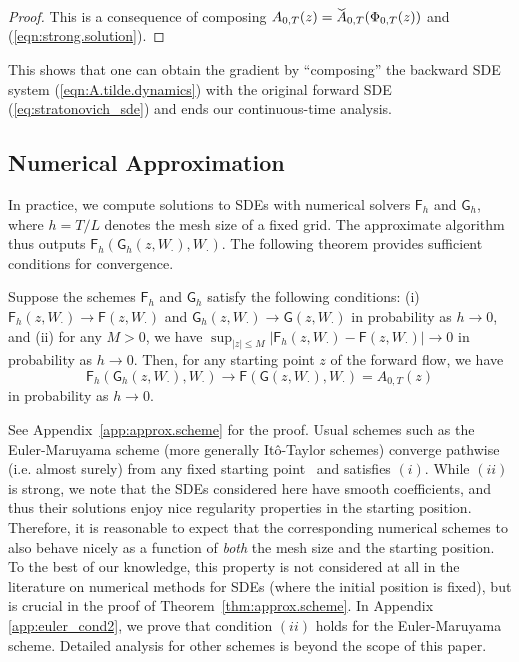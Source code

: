 \documentclass[twoside]{article}
\begin{document}
\begin{proof}
This is a consequence of composing $A_{0, T}(z) = \widecheck{A}_{0, T} (\Phi_{0, T}(z))$ and (\ref{eqn:strong.solution}).
\end{proof}
This shows that one can obtain the gradient by ``composing'' the backward SDE system (\ref{eqn:A.tilde.dynamics}) with the original forward SDE (\ref{eq:stratonovich_sde}) and ends our continuous-time analysis.




\subsection{Numerical Approximation} \label{subsec:numerical_approximation}
In practice, we compute solutions to SDEs with numerical solvers $\mathsf{F}_h$ and $\mathsf{G}_h$, where $h = T / L$ denotes the mesh size of a fixed grid. The approximate algorithm thus outputs $\mathsf{F}_h(\mathsf{G}_h(z, W_{\cdot}), W_{\cdot})$. The following theorem provides sufficient conditions for convergence. 

\begin{theo} \label{thm:approx.scheme}
Suppose the schemes $\mathsf{F}_h$ and $\mathsf{G}_h$ satisfy the following conditions: (i) $\mathsf{F}_h(z, W_{\cdot}) \rightarrow \mathsf{F}(z, W_{\cdot})$ and $\mathsf{G}_h(z, W_{\cdot}) \rightarrow \mathsf{G}(z, W_{\cdot})$ in probability as $h \rightarrow 0$, and (ii) for any $M > 0$, we have $\sup_{| z | \le M} | \mathsf{F}_h(z, W_{\cdot}) - \mathsf{F}(z, W_{\cdot}) | \rightarrow 0$ in probability as $h \rightarrow 0$. Then, for any starting point $z$ of the forward flow, we have
\[
\mathsf{F}_h(\mathsf{G}_h(z, W_{\cdot}), W_{\cdot}) \rightarrow \mathsf{F}(\mathsf{G}(z, W_{\cdot}), W_{\cdot}) = A_{0, T}(z)
\]
in probability as $h \rightarrow 0$.
\end{theo}

See Appendix~\ref{app:approx.scheme} for the proof. 
Usual schemes such as the Euler-Maruyama scheme (more generally It\^o-Taylor schemes) converge pathwise (i.e. almost surely) from any fixed starting point~\cite{kloeden2007pathwise} and satisfies $(i)$. 
While $(ii)$ is strong, we note that the SDEs considered here have smooth coefficients, and thus their solutions enjoy nice regularity properties in the starting position. 
Therefore, it is reasonable to expect that the corresponding numerical schemes to also behave nicely as a function of \textit{both} the mesh size and the starting position. 
To the best of our knowledge, this property is not considered at all in the literature on numerical methods for SDEs (where the initial position is fixed), but is crucial in the proof of Theorem~\ref{thm:approx.scheme}. 
In Appendix \ref{app:euler_cond2}, we prove that condition $(ii)$ holds for the Euler-Maruyama scheme.
Detailed analysis for other schemes is beyond the scope of this paper.
\end{document}
